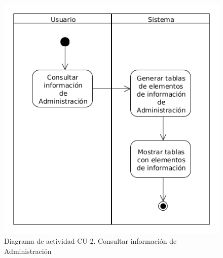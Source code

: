 \begin{figure}[!ht]
  \begin{center}
  \includegraphics[width=1\textwidth]{../images/diag_act_cu_02.png}
  \caption{Diagrama de actividad CU-2. Consultar información de Administración}
  \label{fig:diag_act_cu_02}
  \end{center}
\end{figure}

